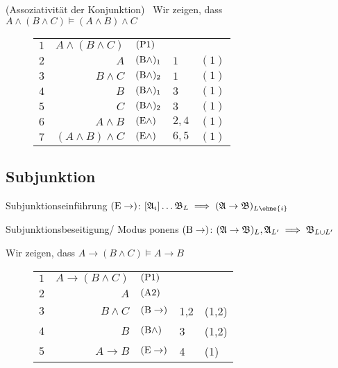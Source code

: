 \documentclass[11pt, a4paper]{article}
\begin{document}
\begin{bsp}(Assoziativität der Konjunktion) \ 
	Wir zeigen, dass $A \land (B \land C) \models (A \land B) \land C$
	\begin{figure}[h]
	\centering
	
	
	\begin{tabular}{l r | l l l}
		$1$ & $A \land (B \land C)$ &  $(\text{P}1)$ & &\\
		$2$ & $A$ &  $(\text{B}\land)_1$ & $1$ & $(1)$\\
		$3$ & $B \land C$ &  $(\text{B}\land)_2$ & $1$ & $(1)$\\
		$4$ & $B$ &  $(\text{B}\land)_1$ & $3$ & $(1)$\\
		$5$ & $C$ &  $(\text{B}\land)_2$ & $3$ & $(1)$\\
		$6$ & $A \land B$ &  $(\text{E}\land)$ & $2,4$ & $(1)$\\
		$7$ & $(A \land B) \land C$ &  $(\text{E}\land)$ & $6,5$ & $(1)$\\
	\end{tabular}

	\end{figure}
\end{bsp}

\subsection{Subjunktion}

\begin{regel}{Subjunktionseinführung}{}
	$(\text{E}\rightarrow)$: $[\AA_i] \dots \BB_L \implies (\AA \rightarrow \BB)_{L \ohne \{i\} }$		
\end{regel}

\begin{regel}{Subjunktionsbeseitigung/ Modus ponens}{}
	$(\text{B}\rightarrow)$: $(\mathfrak{A} \rightarrow \mathfrak{B})_L , \mathfrak{A}_{L'} \implies \mathfrak{B}_{L \cup L'}$		
\end{regel}

\begin{bsp}
	Wir zeigen, dass $A \rightarrow (B \land C) \models A \rightarrow B$
	\begin{figure}[h]
	\centering
	
	
	\begin{tabular}{l r | l l l}
		$1$ & $A \rightarrow (B \land C)$ &  $(\text{P}1)$ & &\\
		$2$ & $A$ &  $(\text{A}2)$ & &\\
		$3$ & $B \land C$ &  $(\text{B}\rightarrow)$ & 1,2& (1,2)\\
		$4$ & $B$ &  $(\text{B}\land)$ & 3& (1,2)\\
		$5$ & $A \rightarrow B$ &  $(\text{E}\rightarrow)$ & 4& (1)\\
	\end{tabular}

	\end{figure}
\end{bsp}
\end{document}
